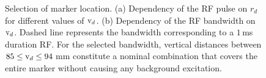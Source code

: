 \documentclass[journal]{IEEEtran}
\begin{document}
\begin{figure}
\begin{center}
\end{center}
\caption{Selection of marker location. (a) Dependency of the RF pulse on $r_d$ for different values of  $\textnormal{v}_d$. (b) Dependency of the RF bandwidth on $\textnormal{v}_d$. Dashed line represents the bandwidth corresponding to a $1\,$ms duration RF. For the selected bandwidth, vertical distances between  $85\le \textnormal{v}_d \le 94\,$mm constitute a nominal combination that covers the entire marker without causing any background excitation.}
\vspace{-10pt}
\end{figure}
\end{document}
